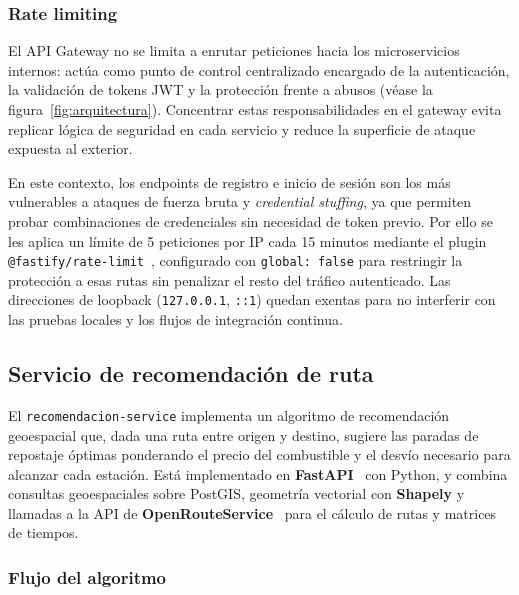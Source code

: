 \subsubsection*{Rate limiting}

El API Gateway no se limita a enrutar peticiones hacia los microservicios
internos: actúa como punto de control centralizado encargado de la
autenticación, la validación de tokens JWT y la protección frente a abusos
(véase la figura~\ref{fig:arquitectura}). Concentrar estas responsabilidades
en el gateway evita replicar lógica de seguridad en cada servicio y reduce
la superficie de ataque expuesta al exterior.

En este contexto, los endpoints de registro e inicio de sesión son los más
vulnerables a ataques de fuerza bruta y \textit{credential stuffing}, ya que
permiten probar combinaciones de credenciales sin necesidad de token previo.
Por ello se les aplica un límite de 5 peticiones por IP cada 15 minutos
mediante el plugin \texttt{@fastify/rate-limit}~\cite{fastify_ratelimit},
configurado con \texttt{global: false} para restringir la protección a esas
rutas sin penalizar el resto del tráfico autenticado. Las direcciones de
loopback (\texttt{127.0.0.1}, \texttt{::1}) quedan exentas para no interferir
con las pruebas locales y los flujos de integración continua.

\subsection{Servicio de recomendación de ruta}
\label{subsec:recomendacion_impl}

El \texttt{recomendacion-service} implementa un algoritmo de recomendación geoespacial
que, dada una ruta entre origen y destino, sugiere las paradas de repostaje óptimas
ponderando el precio del combustible y el desvío necesario para alcanzar cada estación.
Está implementado en \textbf{FastAPI}~\cite{fastapi} con Python, y
combina consultas geoespaciales sobre PostGIS, geometría vectorial con
\textbf{Shapely} \cite{shapely} y llamadas a la API de \textbf{OpenRouteService}~\cite{openrouteservice_api}
para el cálculo de rutas y matrices de tiempos.

\subsubsection*{Flujo del algoritmo}

